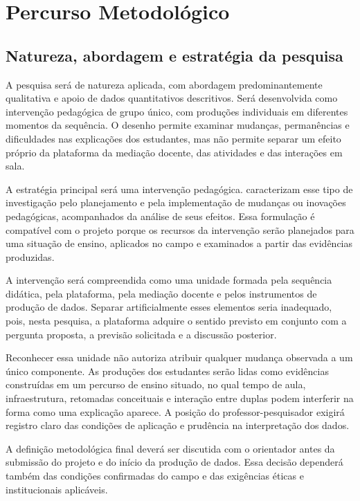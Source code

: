 \chapter{Percurso Metodológico}

\section{Natureza, abordagem e estratégia da pesquisa}

A pesquisa será de natureza aplicada, com abordagem predominantemente qualitativa e apoio de dados quantitativos descritivos. Será desenvolvida como intervenção pedagógica de grupo único, com produções individuais em diferentes momentos da sequência. O desenho permite examinar mudanças, permanências e dificuldades nas explicações dos estudantes, mas não permite separar um efeito próprio da plataforma da mediação docente, das atividades e das interações em sala.

A estratégia principal será uma intervenção pedagógica.  caracterizam esse tipo de investigação pelo planejamento e pela implementação de mudanças ou inovações pedagógicas, acompanhados da análise de seus efeitos. Essa formulação é compatível com o projeto porque os recursos da intervenção serão planejados para uma situação de ensino, aplicados no campo e examinados a partir das evidências produzidas.

A intervenção será compreendida como uma unidade formada pela sequência didática, pela plataforma, pela mediação docente e pelos instrumentos de produção de dados. Separar artificialmente esses elementos seria inadequado, pois, nesta pesquisa, a plataforma adquire o sentido previsto em conjunto com a pergunta proposta, a previsão solicitada e a discussão posterior.

Reconhecer essa unidade não autoriza atribuir qualquer mudança observada a um único componente. As produções dos estudantes serão lidas como evidências construídas em um percurso de ensino situado, no qual tempo de aula, infraestrutura, retomadas conceituais e interação entre duplas podem interferir na forma como uma explicação aparece. A posição do professor-pesquisador exigirá registro claro das condições de aplicação e prudência na interpretação dos dados.

A definição metodológica final deverá ser discutida com o orientador antes da submissão do projeto e do início da produção de dados. Essa decisão dependerá também das condições confirmadas do campo e das exigências éticas e institucionais aplicáveis.

